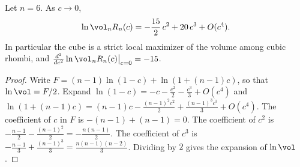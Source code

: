 \begin{theorem}\label{thm:main}
Let $n=6$. As $c\to0$,
\[
\ln\vol_nR_n(c)=- \frac{15}{2}\,c^2+20\,c^3+O(c^4).
\]
In particular the cube is a strict local maximizer of the volume among cubic rhombi, and $\frac{d^2}{dc^2}\ln\vol_nR_n(c)\big|_{c=0}=-15$.
\end{theorem}
\begin{proof}
Write $F=(n-1)\ln(1-c)+\ln(1+(n-1)c)$, so that $\ln\vol=F/2$.
Expand $\ln(1-c)=-c-\frac{c^2}{2}-\frac{c^3}{3}+O(c^4)$ and $\ln(1+(n-1)c)=(n-1)c-\frac{(n-1)^2c^2}{2}+\frac{(n-1)^3c^3}{3}+O(c^4)$.
The coefficient of $c$ in $F$ is $-(n-1)+(n-1)=0$.
The coefficient of $c^2$ is $-\frac{n-1}{2}-\frac{(n-1)^2}{2}=-\frac{n(n-1)}{2}$.
The coefficient of $c^3$ is $-\frac{n-1}{3}+\frac{(n-1)^3}{3}=\frac{n(n-1)(n-2)}{3}$.
Dividing by $2$ gives the expansion of $\ln\vol$.
\end{proof}
